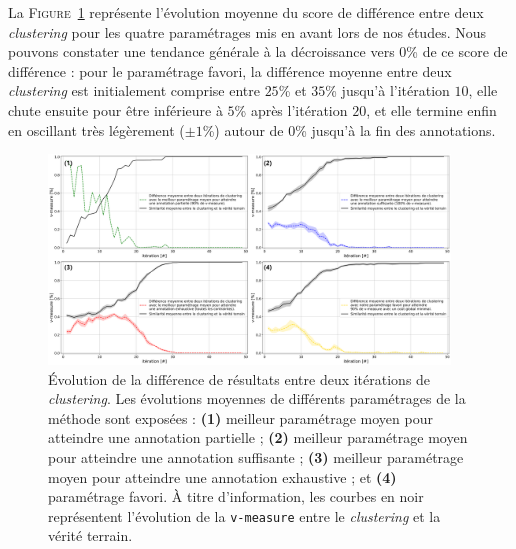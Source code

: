 			La \textsc{Figure~\ref{figure:4.5.2-ETUDE-RENTABILITE-SIMILARITE-CLUSTERING}} représente l'évolution moyenne du score de différence entre deux \textit{clustering} pour les quatre paramétrages mis en avant lors de nos études.
			Nous pouvons constater une tendance générale à la décroissance vers $0$\% de ce score de différence : pour le paramétrage favori, la différence moyenne entre deux \textit{clustering} est initialement comprise entre $25$\% et $35$\% jusqu'à l'itération $10$, elle chute ensuite pour être inférieure à $5$\% après l'itération $20$, et elle termine enfin en oscillant très légèrement ($\pm1$\%) autour de $0$\% jusqu'à la fin des annotations.
			\begin{figure}[!htb]
				\centering
				\includegraphics[width=0.95\textwidth]{figures/etude-rentabilite-similarite-clustering}
				\caption{
					Évolution de la différence de résultats entre deux itérations de \textit{clustering}.
					Les évolutions moyennes de différents paramétrages de la méthode sont exposées :
					\textbf{(1)} meilleur paramétrage moyen pour atteindre une annotation partielle ;
					\textbf{(2)} meilleur paramétrage moyen pour atteindre une annotation suffisante ;
					\textbf{(3)} meilleur paramétrage moyen pour atteindre une annotation exhaustive ;
					et \textbf{(4)} paramétrage favori.
					À titre d'information, les courbes en noir représentent l'évolution de la \texttt{v-measure} entre le \textit{clustering} et la vérité terrain.
				}
				\label{figure:4.5.2-ETUDE-RENTABILITE-SIMILARITE-CLUSTERING}
			\end{figure}
			
